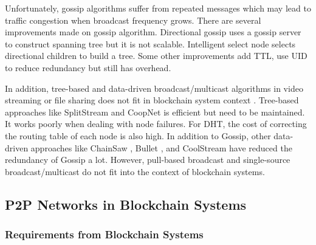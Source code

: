 Unfortunately, gossip algorithms suffer from repeated messages which may lead to traffic congestion when broadcast frequency grows. There are several improvements made on gossip algorithm. Directional gossip uses a gossip server to construct spanning tree but it is not scalable. Intelligent select node selects directional children to build a tree. Some other improvements add TTL, use UID to reduce redundancy but still has overhead.

In addition, tree-based and data-driven broadcast/multicast algorithms in video streaming or file sharing does not fit in blockchain system context \cite{liu2008opportunities}. Tree-based approaches like SplitStream \cite{castro2003splitstream} and CoopNet \cite{padmanabhan2002distributing} is efficient but need to be maintained. It works poorly when dealing with node failures. For DHT, the cost of correcting the routing table of each node is also high. In addition to Gossip, other data-driven approaches like ChainSaw \cite{pai2005chainsaw}, Bullet \cite{kostic2003bullet}, and CoolStream \cite{zhang2005coolstreaming} have reduced the redundancy of Gossip a lot. However, pull-based broadcast and single-source broadcast/multicast do not fit into the context of blockchain systems.

\subsection{P2P Networks in Blockchain Systems}

\subsubsection{Requirements from Blockchain Systems}

